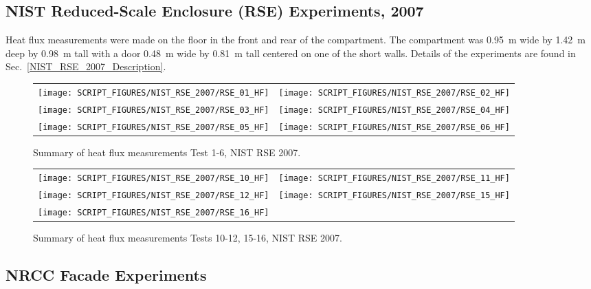 \clearpage

\subsection{NIST Reduced-Scale Enclosure (RSE) Experiments, 2007}

Heat flux measurements were made on the floor in the front and rear of the compartment. The compartment was 0.95~m wide by 1.42~m deep by 0.98~m tall with a door 0.48~m wide by 0.81~m tall centered on one of the short walls.  Details of the experiments are found in Sec.~\ref{NIST_RSE_2007_Description}.

\begin{figure}[!ht]
\begin{tabular*}{\textwidth}{l@{\extracolsep{\fill}}r}
\texttt{[image: SCRIPT\_FIGURES/NIST\_RSE\_2007/RSE\_01\_HF]} &
\texttt{[image: SCRIPT\_FIGURES/NIST\_RSE\_2007/RSE\_02\_HF]} \\
\texttt{[image: SCRIPT\_FIGURES/NIST\_RSE\_2007/RSE\_03\_HF]} &
\texttt{[image: SCRIPT\_FIGURES/NIST\_RSE\_2007/RSE\_04\_HF]} \\
\texttt{[image: SCRIPT\_FIGURES/NIST\_RSE\_2007/RSE\_05\_HF]} &
\texttt{[image: SCRIPT\_FIGURES/NIST\_RSE\_2007/RSE\_06\_HF]}
\end{tabular*}
\caption[Summary of Test 1, NIST RSE 2007]{Summary of heat flux measurements Test 1-6, NIST RSE 2007.}
\label{NIST_RSE_2007_HF_1}
\end{figure}

\newpage

\begin{figure}[p]
\begin{tabular*}{\textwidth}{l@{\extracolsep{\fill}}r}
\texttt{[image: SCRIPT\_FIGURES/NIST\_RSE\_2007/RSE\_10\_HF]} &
\texttt{[image: SCRIPT\_FIGURES/NIST\_RSE\_2007/RSE\_11\_HF]} \\
\texttt{[image: SCRIPT\_FIGURES/NIST\_RSE\_2007/RSE\_12\_HF]} &
\texttt{[image: SCRIPT\_FIGURES/NIST\_RSE\_2007/RSE\_15\_HF]} \\
\texttt{[image: SCRIPT\_FIGURES/NIST\_RSE\_2007/RSE\_16\_HF]} &

\end{tabular*}
\caption[Summary of Test 2, NIST RSE 2007]{Summary of heat flux measurements Tests 10-12, 15-16, NIST RSE 2007.}
\label{NIST_RSE_2007_HF_2}
\end{figure}

\clearpage


\subsection{NRCC Facade Experiments}

